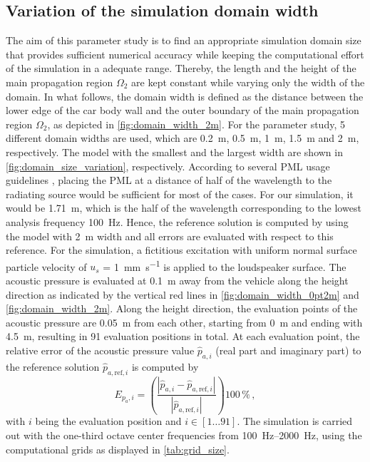 {\subsection*{Variation of the simulation domain width}
The aim of this parameter study is to find an appropriate simulation domain size that provides sufficient numerical accuracy while keeping the computational effort of the simulation in a adequate range. 
Thereby, the length and the height of the main propagation region $\Omega_2$ are kept constant while varying only the width of the domain. 
In what follows, the domain width is defined as the distance between the lower edge of the car body wall and the outer boundary of the main propagation region $\Omega_2$, as depicted in \cref{fig:domain_width_2m}. For the parameter study, 5 different domain widths are used, which are \SI{0.2}{\meter}, \SI{0.5}{\meter}, \SI{1}{\meter}, \SI{1.5}{\meter} and \SI{2}{\meter}, respectively. The model with the smallest and the largest width are shown in \cref{fig:domain_size_variation}, respectively. 
According to several PML usage guidelines \cite{PML_3ds, PML_comsol, PML_quickwave}, placing the PML at a distance of half of the wavelength to the radiating source would be sufficient for most of the cases. 
For our simulation, it would be \SI{1.71}{\meter}, which is the half of the wavelength corresponding to the lowest analysis frequency \SI{100}{\hertz}.
Hence, the reference solution is computed by using the model with \SI{2}{\meter} width and all errors are evaluated with respect to this reference. For the simulation, a fictitious excitation with uniform normal surface particle velocity of $u_s$ = \SI{1}{\milli\meter\per\second} is applied to the loudspeaker surface. 
The acoustic pressure is evaluated at \SI{0.1}{\meter} away from the vehicle along the height direction as indicated by the vertical red lines in \cref{fig:domain_width_0pt2m} and \cref{fig:domain_width_2m}. Along the height direction, the evaluation points of the acoustic pressure are \SI{0.05}{\meter} from each other, starting from \SI{0}{\meter} and ending with \SI{4.5}{\meter}, resulting in 91 evaluation positions in total. At each evaluation point, the relative error of the acoustic pressure value $\hat{p}_{a,i}$ (real part and imaginary part) to the reference solution $\hat{p}_{a,\text{ref},i}$ is computed by
\begin{equation}
	E_{p_a,i} = \left(\frac{\left| \hat{p}_{a,i} - \hat{p}_{a,\text{ref},i} \right|}{\left|\hat{p}_{a,\text{ref},i}\right|}\right)100\,\% \,,
\end{equation}
with $i$ being the evaluation position and $i \in \left[1\dots91\right]$. The simulation is carried out with the one-third octave center frequencies from \SIrange{100}{2000}{\hertz}, using the computational grids as displayed in \cref{tab:grid_size}.

}
